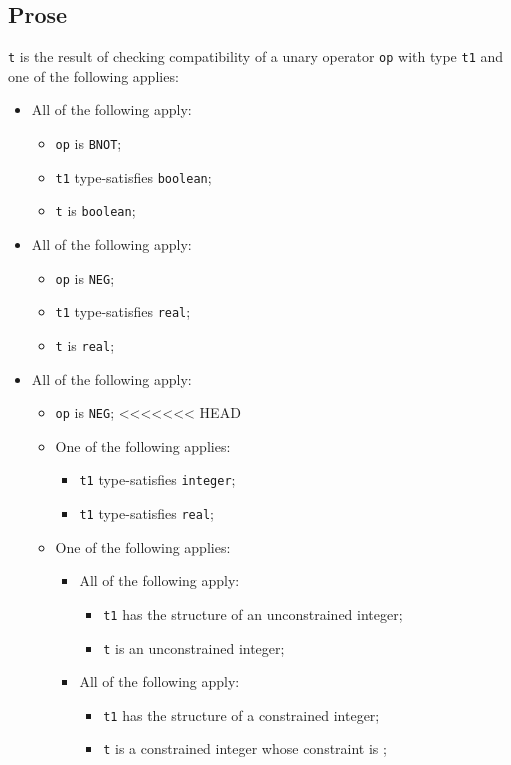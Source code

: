 \documentclass{book}
\begin{document}
\subsection{Prose}
  \texttt{t} is the result of checking compatibility of a unary operator \texttt{op} with
  type \texttt{t1} and one of the following applies:
  \begin{itemize}
  \item All of the following apply:
    \begin{itemize}
      \item \texttt{op} is \texttt{BNOT};
      \item \texttt{t1} type-satisfies \texttt{boolean};
      \item \texttt{t} is \texttt{boolean};
    \end{itemize}

  \item All of the following apply:
  \begin{itemize}
    \item \texttt{op} is \texttt{NEG};
    \item \texttt{t1} type-satisfies \texttt{real};
    \item \texttt{t} is \texttt{real};
  \end{itemize}

  \item All of the following apply:
    \begin{itemize}
    \item \texttt{op} is \texttt{NEG};
<<<<<<< HEAD
    \item One of the following applies:
      \begin{itemize}
      \item \texttt{t1} type-satisfies \texttt{integer};
      \item \texttt{t1} type-satisfies \texttt{real};
      \end{itemize}
     \item One of the following applies:
       \begin{itemize}
       \item All of the following apply:
         \begin{itemize}
         \item \texttt{t1} has the structure of an unconstrained integer;
         \item \texttt{t} is an unconstrained integer;
         \end{itemize}
       \item All of the following apply:
         \begin{itemize}
         \item \texttt{t1} has the structure of a constrained integer;
         \item \texttt{t} is a constrained integer whose constraint is ;
         \end{itemize}
       \end{itemize}
    \end{itemize}


\end{itemize}
\end{document}
